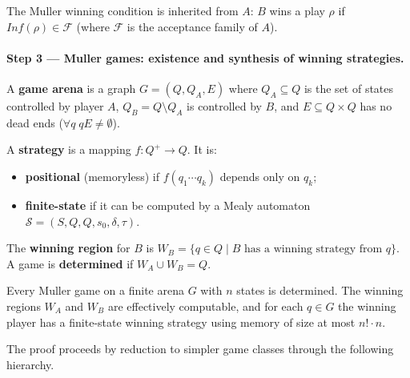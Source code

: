 \documentclass[oneside]{academica}
\begin{document}
The Muller winning condition is inherited from $A$: $B$ wins a play $\rho$ if $\mathit{Inf}(\rho) \in \mathcal{F}$ (where $\mathcal{F}$ is the acceptance family of $A$).

\paragraph{Step 3 — Muller games: existence and synthesis of winning strategies.}

\begin{definition*}[Arena]
  A \textbf{game arena} is a graph $G = (Q, Q_A, E)$ where $Q_A \subseteq Q$ is the set of states controlled by player $A$, $Q_B = Q \setminus Q_A$ is controlled by $B$, and $E \subseteq Q \times Q$ has no dead ends ($\forall q\; qE \ne \emptyset$).
\end{definition*}

\begin{definition*}
  A \textbf{strategy} is a mapping $f : Q^+ \to Q$. It is:
  \begin{itemize}
    \item \textbf{positional} (memoryless) if $f(q_1 \cdots q_k)$ depends only on $q_k$;
    \item \textbf{finite-state} if it can be computed by a Mealy automaton $\mathcal{S} = (S, Q, Q, s_0, \delta, \tau)$.
  \end{itemize}
\end{definition*}

\begin{definition*}
  The \textbf{winning region} for $B$ is $W_B = \{q \in Q \mid B \text{ has a winning strategy from } q\}$.
  A game is \textbf{determined} if $W_A \cup W_B = Q$.
\end{definition*}

\begin{theorem*}
  Every Muller game on a finite arena $G$ with $n$ states is determined. The winning regions $W_A$ and $W_B$ are effectively computable, and for each $q \in G$ the winning player has a finite-state winning strategy using memory of size at most $n! \cdot n$.
\end{theorem*}

The proof proceeds by reduction to simpler game classes through the following hierarchy.
\end{document}
